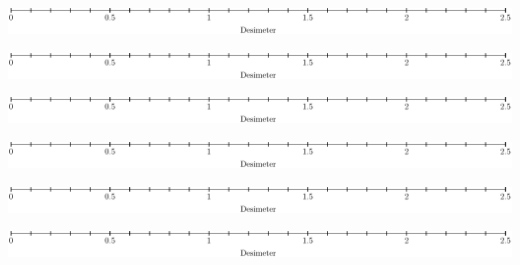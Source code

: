 \documentclass[a4paper,landscape,english]{article}
\begin{document}
\begin{center}
	\includegraphics[]{linjal2} \vspace{50pt}
	
	\includegraphics[]{linjal2} \vspace{50pt}
	
		\includegraphics[]{linjal2} \vspace{50pt}
		
			\includegraphics[]{linjal2} \vspace{50pt}
			
				\includegraphics[]{linjal2} \vspace{50pt}
				
					\includegraphics[]{linjal2} \vspace{50pt}
\end{center}
\end{document}
